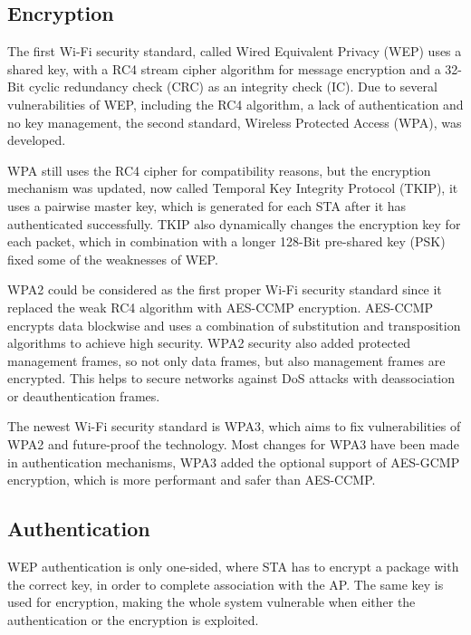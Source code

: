 \subsection{Encryption}

The first Wi-Fi security standard, called Wired Equivalent Privacy (WEP) uses a shared key, with a RC4 stream cipher algorithm for message encryption and a 32-Bit cyclic redundancy check (CRC) as an integrity check (IC).
Due to several vulnerabilities of WEP, including the RC4 algorithm, a lack of authentication and no key management, the second standard, Wireless Protected Access (WPA), was developed.

WPA still uses the RC4 cipher for compatibility reasons, but the encryption mechanism was updated, now called Temporal Key Integrity Protocol (TKIP), it uses a pairwise master key, which is generated for each STA after it has authenticated successfully.
TKIP also dynamically changes the encryption key for each packet, which in combination with a longer 128-Bit pre-shared key (PSK) fixed some of the weaknesses of WEP. \cite{Oriyano_2017}

WPA2 could be considered as the first proper Wi-Fi security standard since it replaced the weak RC4 algorithm with AES-CCMP encryption.
AES-CCMP encrypts data blockwise and uses a combination of substitution and transposition algorithms to achieve high security.
WPA2 security also added protected management frames, so not only data frames, but also management frames are encrypted.
This helps to secure networks against DoS attacks with deassociation or deauthentication frames.

The newest Wi-Fi security standard is WPA3, which aims to fix vulnerabilities of WPA2 and future-proof the technology.
Most changes for WPA3 have been made in authentication mechanisms, WPA3 added the optional support of AES-GCMP encryption, which is more performant and safer than AES-CCMP. \cite[page~103-117]{Sankaran_Gulasekaran_2021}


\subsection{Authentication}

WEP authentication is only one-sided, where STA has to encrypt a package with the correct key, in order to complete association with the AP. 
The same key is used for encryption, making the whole system vulnerable when either the authentication or the encryption is exploited. 

